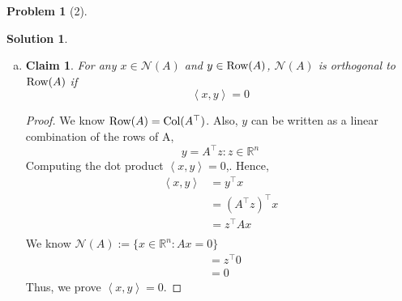 \documentclass{amsart}[11pt]
\newtheorem*{claim}{Claim}
\theoremstyle{definition}
\newtheorem*{problem}{Problem}
\newtheorem*{solution}{Solution}
\newcommand{\R}{\mathbb{R}}
\newcommand{\bracket}[1]{\left\langle#1\right\rangle}
\newcommand{\col}{\textnormal{Col}}
\newcommand{\row}{\textnormal{Row}}
\begin{document}
\begin{problem}[2]
\begin{solution}
\begin{enumerate}[(a)]
\begin{proof}
            \noindent Since both inclusions hold, we can conclude $\boldsymbol{\mathcal{N}(A^\top A)=\mathcal{N}(A)}$.
        \end{proof}
        \vspace{\baselineskip}
        \item \begin{claim}
        For any $x\in\mathcal{N}(A)$ and $y\in \row(A)$, $\mathcal{N}(A)$ is orthogonal to $\row(A)$ if
        \[\bracket{x,y}=0\]
        \end{claim}
        \begin{proof}
            We know $\row(A) = \col(A^\top)$. Also, $y$ can be written as a linear combination of the rows of A, 
            \[y=A^\top z : z\in\R^n\]
            Computing the dot product $\bracket{x,y} = 0$,. Hence, 
            \begin{align*}
            	\bracket{x,y} &= y^\top x \\
                &= (A^\top z)^\top x \\
                &= z^\top Ax \\
            \end{align*}
            We know $\mathcal{N}(A):=\{x\in\R^n:Ax=0\}$
            \begin{align*}
                &= z^\top 0 \\
                &= 0 
            \end{align*}
            Thus, we prove $\bracket{x,y} = 0$. 
            

\end{proof}
\end{enumerate}
\end{solution}
\end{problem}
\end{document}

